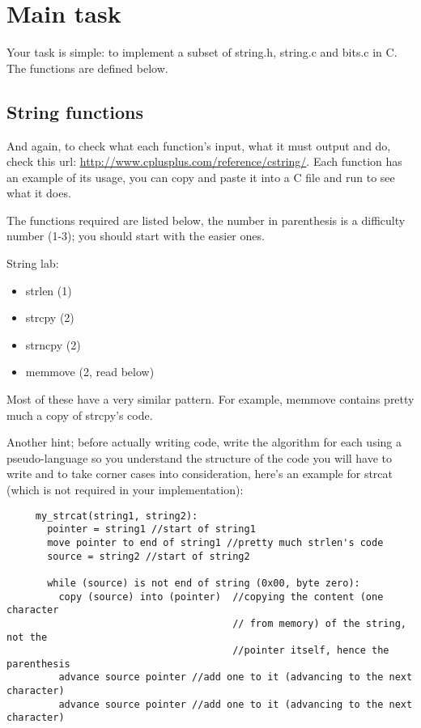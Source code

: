 \documentclass[11pt]{article}
\begin{document}
\section{Main task}

 Your task is simple: to implement a subset of string.h, string.c and bits.c in C.
 The functions are defined below.
 
\subsection{String functions}

 And again, to check what each function's input, what it must output and do, check this url: \url{http://www.cplusplus.com/reference/cstring/}. Each function has an example of its usage, you can copy and paste it into a C file and run to see what it does.
 
 The functions required are listed below, the number in parenthesis is a difficulty number (1-3); you should start with the easier ones.
 

String lab:
 
 \begin{itemize}
   \item strlen (1)
   \item strcpy (2)
   \item strncpy (2)
   \item memmove (2, read below)
 \end{itemize}

 Most of these have a very similar pattern. For example, memmove contains pretty much a copy of strcpy's code.
 
  Another hint; before actually writing code, write the algorithm for each using a pseudo-language so you understand the structure of the code you will have to write and to take corner cases into consideration, here's an example for strcat (which is not required in your implementation):
 
 \begin{verbatim}
     my_strcat(string1, string2):
       pointer = string1 //start of string1
       move pointer to end of string1 //pretty much strlen's code
       source = string2 //start of string2
       
       while (source) is not end of string (0x00, byte zero):
         copy (source) into (pointer)  //copying the content (one character 
                                       // from memory) of the string, not the 
                                       //pointer itself, hence the parenthesis
         advance source pointer //add one to it (advancing to the next character)
         advance source pointer //add one to it (advancing to the next character)
 \end{verbatim}
 
\end{document}
